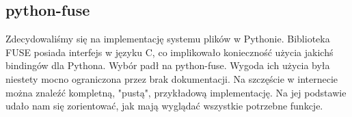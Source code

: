 
\subsection{python-fuse}

Zdecydowaliśmy się na implementację systemu plików w Pythonie. Biblioteka FUSE
posiada interfejs w języku C, co implikowało konieczność użycia jakichś
bindingów dla Pythona. Wybór padł na python-fuse. Wygoda ich użycia była
niestety mocno ograniczona przez brak dokumentacji. Na szczęście w internecie
można znaleźć kompletną, "pustą", przykładową implementację. Na jej podstawie
udało nam się zorientować, jak mają wyglądać wszystkie potrzebne funkcje.

